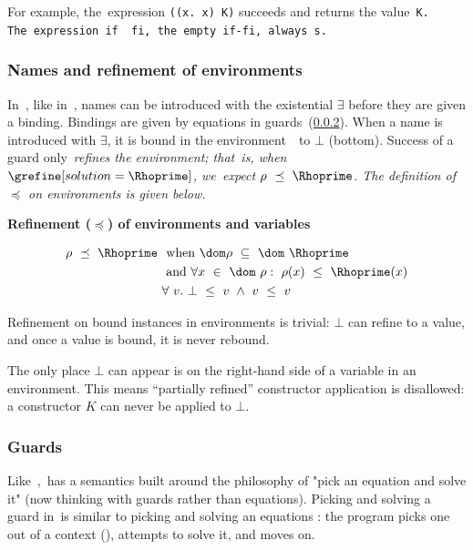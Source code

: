 \documentclass[runningheads]{llncs}
\begin{document}
    For example, the~\VMinus expression {\tt{((}\ttbackslash\tt{x. x) K)}}
    succeeds and returns the value~\tt{K}. %
    The~\VMinus expression~\tt{if~~fi}, the empty~\tt{if-fi}, always {\fail}s. %


    \subsubsection{Names and refinement of environments}

    In~\VMinus, like in~\VC, names can be introduced with the existential
    {$\exists$} before they are given a binding. %
    Bindings are given by equations in guards~(\ref{guards}). %
    When a name is introduced with {$\exists$}, it is bound in the
    environment~\Rho\ to $\bot$ (bottom). %
    Success of a guard only~\it{refines} the environment; that~is, when
    $\grefine[solution=\Rhoprime]$, we~expect $\rho~\preceq~\Rhoprime$. The
    definition of $\preceq$ on environments is given below. %
    
    \smallskip 
    
    \textbf{Refinement ($\preceq$) of environments and variables}

{\scriptsize
    \begin{align*}
    \rho~\preceq~\Rhoprime~&\text{ when }\dom\rho~\subseteq~\dom~\Rhoprime\\
    &\text{ and }\forall x~\in~\dom~\rho:~\rho(x)~\leq~\Rhoprime(x) \\
    &\forall~v.~\bot~\leq~v~\land~v~\leq~v
    \end{align*}
}

    Refinement on bound instances in environments is trivial: 
    $\bot$ can refine to a value, and once a value is bound, 
    it is never rebound. %

    The only place $\bot$ can appear is on the right-hand side of a variable in
    an environment. This means ``partially refined'' constructor application is
    disallowed: a constructor $K$ can never be applied to $\bot$. %
    
    \subsubsection{Guards}
    \label{guards}
    

    Like~\VC,~\VMinus has a semantics built around the philosophy of "pick an
    equation and solve it" (now thinking with guards rather than equations). %
    Picking and solving a guard in~\VMinus is similar to picking and solving an
    equations \VC: the program picks one out of a context (\context), attempts
    to solve it, and moves on. %
\end{document}
